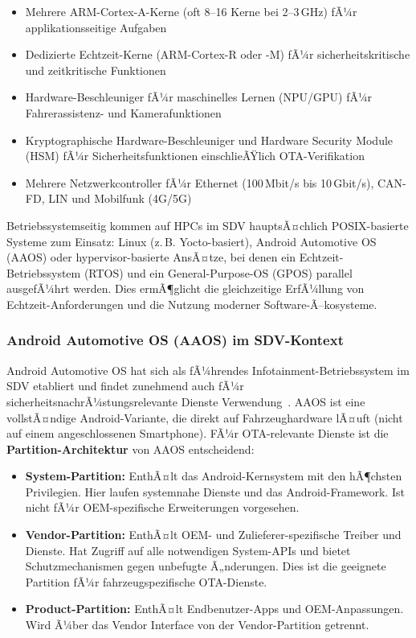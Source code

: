 ﻿\documentclass[12pt,a4paper,twoside]{article}
\begin{document}
\begin{itemize}
  \item Mehrere ARM-Cortex-A-Kerne (oft 8--16 Kerne bei 2--3\,GHz) fÃ¼r
    applikationsseitige Aufgaben
  \item Dedizierte Echtzeit-Kerne (ARM-Cortex-R oder -M) fÃ¼r sicherheitskritische
    und zeitkritische Funktionen
  \item Hardware-Beschleuniger fÃ¼r maschinelles Lernen (NPU/GPU) fÃ¼r
    Fahrerassistenz- und Kamerafunktionen
  \item Kryptographische Hardware-Beschleuniger und Hardware Security Module (HSM)
    fÃ¼r Sicherheitsfunktionen einschlieÃŸlich OTA-Verifikation
  \item Mehrere Netzwerkcontroller fÃ¼r Ethernet (100\,Mbit/s bis 10\,Gbit/s),
    CAN-FD, LIN und Mobilfunk (4G/5G)
\end{itemize}

Betriebssystemseitig kommen auf HPCs im SDV hauptsÃ¤chlich POSIX-basierte
Systeme zum Einsatz: Linux (z.\,B. Yocto-basiert), Android Automotive OS (AAOS)
oder hypervisor-basierte AnsÃ¤tze, bei denen ein Echtzeit-Betriebssystem (RTOS)
und ein General-Purpose-OS (GPOS) parallel ausgefÃ¼hrt werden. Dies ermÃ¶glicht
die gleichzeitige ErfÃ¼llung von Echtzeit-Anforderungen und die Nutzung moderner
Software-Ã–kosysteme.

\subsubsection{Android Automotive OS (AAOS) im SDV-Kontext}

Android Automotive OS hat sich als fÃ¼hrendes Infotainment-Betriebssystem im SDV
etabliert und findet zunehmend auch fÃ¼r sicherheitsnachrÃ¼stungsrelevante Dienste
Verwendung~\cite{schneider2026ladekomm}. AAOS ist eine vollstÃ¤ndige Android-Variante,
die direkt auf Fahrzeughardware lÃ¤uft (nicht auf einem angeschlossenen Smartphone).
FÃ¼r OTA-relevante Dienste ist die \textbf{Partition-Architektur} von AAOS entscheidend:

\begin{itemize}
  \item \textbf{System-Partition:} EnthÃ¤lt das Android-Kernsystem mit den hÃ¶chsten
    Privilegien. Hier laufen systemnahe Dienste und das Android-Framework. Ist nicht
    fÃ¼r OEM-spezifische Erweiterungen vorgesehen.
  \item \textbf{Vendor-Partition:} EnthÃ¤lt OEM- und Zulieferer-spezifische Treiber
    und Dienste. Hat Zugriff auf alle notwendigen System-APIs und bietet
    Schutzmechanismen gegen unbefugte Ã„nderungen. Dies ist die geeignete Partition
    fÃ¼r fahrzeugspezifische OTA-Dienste.
  \item \textbf{Product-Partition:} EnthÃ¤lt Endbenutzer-Apps und OEM-Anpassungen.
    Wird Ã¼ber das Vendor Interface von der Vendor-Partition getrennt.
\end{itemize}
\end{document}

